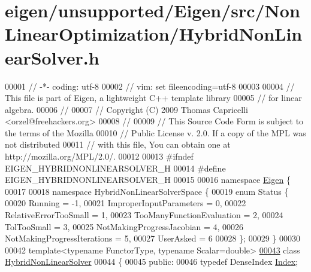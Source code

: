 \hypertarget{eigen_2unsupported_2_eigen_2src_2_non_linear_optimization_2_hybrid_non_linear_solver_8h_source}{}\section{eigen/unsupported/\+Eigen/src/\+Non\+Linear\+Optimization/\+Hybrid\+Non\+Linear\+Solver.h}
\label{eigen_2unsupported_2_eigen_2src_2_non_linear_optimization_2_hybrid_non_linear_solver_8h_source}

\begin{DoxyCode}
00001 \textcolor{comment}{// -*- coding: utf-8}
00002 \textcolor{comment}{// vim: set fileencoding=utf-8}
00003 
00004 \textcolor{comment}{// This file is part of Eigen, a lightweight C++ template library}
00005 \textcolor{comment}{// for linear algebra.}
00006 \textcolor{comment}{//}
00007 \textcolor{comment}{// Copyright (C) 2009 Thomas Capricelli <orzel@freehackers.org>}
00008 \textcolor{comment}{//}
00009 \textcolor{comment}{// This Source Code Form is subject to the terms of the Mozilla}
00010 \textcolor{comment}{// Public License v. 2.0. If a copy of the MPL was not distributed}
00011 \textcolor{comment}{// with this file, You can obtain one at http://mozilla.org/MPL/2.0/.}
00012 
00013 \textcolor{preprocessor}{#ifndef EIGEN\_HYBRIDNONLINEARSOLVER\_H}
00014 \textcolor{preprocessor}{#define EIGEN\_HYBRIDNONLINEARSOLVER\_H}
00015 
00016 \textcolor{keyword}{namespace }\hyperlink{namespace_eigen}{Eigen} \{ 
00017 
00018 \textcolor{keyword}{namespace }HybridNonLinearSolverSpace \{ 
00019     \textcolor{keyword}{enum} Status \{
00020         Running = -1,
00021         ImproperInputParameters = 0,
00022         RelativeErrorTooSmall = 1,
00023         TooManyFunctionEvaluation = 2,
00024         TolTooSmall = 3,
00025         NotMakingProgressJacobian = 4,
00026         NotMakingProgressIterations = 5,
00027         UserAsked = 6
00028     \};
00029 \}
00030 
00042 \textcolor{keyword}{template}<\textcolor{keyword}{typename} FunctorType, \textcolor{keyword}{typename} Scalar=\textcolor{keywordtype}{double}>
\hyperlink{class_eigen_1_1_hybrid_non_linear_solver}{00043} \textcolor{keyword}{class }\hyperlink{class_eigen_1_1_hybrid_non_linear_solver}{HybridNonLinearSolver}
00044 \{
00045 \textcolor{keyword}{public}:
00046     \textcolor{keyword}{typedef} DenseIndex \hyperlink{namespace_eigen_a62e77e0933482dafde8fe197d9a2cfde}{Index};

\end{DoxyCode}
